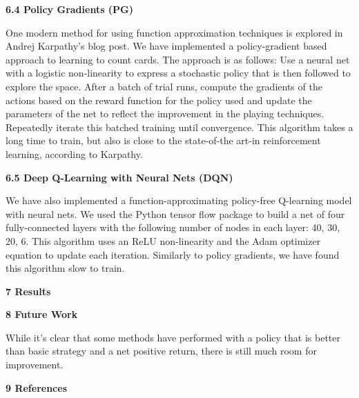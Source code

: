 \documentclass[12pt]{article}
\begin{document}
    \textbf{6.4 Policy Gradients (PG)} \newline

    One modern method for using function approximation techniques is explored in Andrej Karpathy's blog post. We have implemented a policy-gradient based approach to learning to count cards. The approach is as follows: Use a neural net with a logistic non-linearity to express a stochastic policy that is then followed to explore the space. After a batch of trial runs, compute the gradients of the actions based on the reward function for the policy used and update the parameters of the net to reflect the improvement in the playing techniques. Repeatedly iterate this batched training until convergence. This algorithm takes a long time to train, but also is close to the state-of-the art-in reinforcement learning, according to Karpathy. \newline

    \textbf{6.5 Deep Q-Learning with Neural Nets (DQN)} \newline

    We have also implemented a function-approximating policy-free Q-learning model with neural nets. We used the Python tensor flow package to build a net of four fully-connected layers with the following number of nodes in each layer: 40, 30, 20, 6. This algorithm uses an ReLU non-linearity and the Adam optimizer equation to update each iteration. Similarly to policy gradients, we have found this algorithm slow to train. \newline

    {\large \textbf{7 Results}} \newline

    {\large \textbf{8 Future Work}} \newline

    While it's clear that some methods have performed with a policy that is better than basic strategy and a net positive return, there is still much room for improvement.

    {\large \textbf{9 References}} \newline
\end{document}
